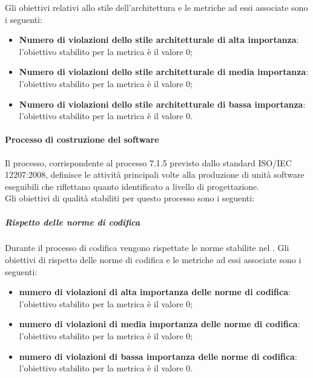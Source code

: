 				Gli obiettivi relativi allo stile dell'architettura e le metriche ad essi associate sono i seguenti:
		 		\begin{itemize}
					\item \textbf{Numero di violazioni dello stile architetturale di alta importanza}: l'obiettivo stabilito per la metrica è il valore 0;
					\item \textbf{Numero di violazioni dello stile architetturale di media importanza}: l'obiettivo stabilito per la metrica è il valore 0;
					\item \textbf{Numero di violazioni dello stile architetturale di bassa importanza}: l'obiettivo stabilito per la metrica è il valore 0.
				\end{itemize}
				
			\paragraph{Processo di costruzione del software}
			Il processo, corrispondente al processo 7.1.5 previsto dallo standard ISO/IEC 12207:2008, definisce le attività principali volte alla produzione di unità software eseguibili che riflettano quanto identificato a livello di progettazione.
			\\Gli obiettivi di qualità stabiliti per questo processo sono i seguenti:
				\subparagraph{Rispetto delle norme di codifica}
				Durante il processo di codifica vengono rispettate le norme stabilite nel \NdP{}.
				Gli obiettivi di rispetto delle norme di codifica e le metriche ad essi associate sono i seguenti:
		 		\begin{itemize}
					\item \textbf{numero di violazioni di alta importanza delle norme di codifica}: l'obiettivo stabilito per la metrica è il valore 0;
					\item \textbf{numero di violazioni di media importanza delle norme di codifica}: l'obiettivo stabilito per la metrica è il valore 0;
					\item \textbf{numero di violazioni di bassa importanza delle norme di codifica}: l'obiettivo stabilito per la metrica è il valore 0.
				\end{itemize}
				
